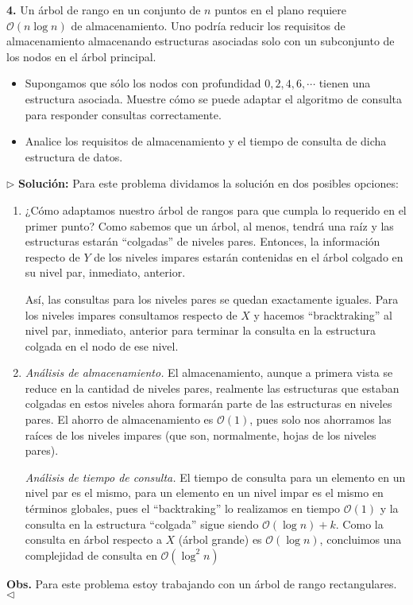 \textbf{4.} Un árbol de rango en un conjunto de $n$ puntos en el plano requiere
$\mathcal{O}(n \log n)$ de almacenamiento. Uno podría reducir los requisitos de
almacenamiento almacenando estructuras asociadas solo con un subconjunto de los
nodos en el árbol principal.

\begin{itemize}
\item Supongamos que sólo los nodos con profundidad $0, 2, 4, 6, \dotsm$ tienen
  una estructura asociada. Muestre cómo se puede adaptar el algoritmo de consulta
  para responder consultas correctamente.
\item Analice los requisitos de almacenamiento y el tiempo de consulta de dicha
  estructura de datos.
\end{itemize}

$\rhd$ \textbf{Solución:} Para este problema dividamos la solución en dos posibles
opciones:
\begin{enumerate}
\item ¿Cómo adaptamos nuestro árbol de rangos para que cumpla lo requerido en el primer
  punto? Como sabemos que un árbol, al menos, tendrá una raíz y las estructuras estarán
  ``colgadas'' de niveles pares. Entonces, la información respecto de $Y$ de los niveles
  impares estarán contenidas en el árbol colgado en su nivel par, inmediato, anterior.
  \newline
  
  Así, las consultas para los niveles pares se quedan exactamente iguales. Para los niveles
  impares consultamos respecto de $X$ y hacemos ``bracktraking'' al nivel par, inmediato,
  anterior para terminar la consulta en la estructura colgada en el nodo de ese nivel.
\item \textit{Análisis de almacenamiento.} El almacenamiento, aunque a primera vista se reduce
  en la cantidad de niveles pares, realmente las estructuras que estaban colgadas en estos niveles
  ahora formarán parte de las estructuras en niveles pares. El ahorro de almacenamiento es $\mathcal{O}(1)$,
  pues solo nos ahorramos las raíces de los niveles impares (que son, normalmente, hojas de los niveles
  pares).\newline
  
  \textit{Análisis de tiempo de consulta.} El tiempo de consulta para un elemento en un nivel par es el mismo,
  para un elemento en un nivel impar es el mismo en términos globales, pues el ``backtraking'' lo realizamos
  en tiempo $\mathcal{O}(1)$ y la consulta en la estructura ``colgada'' sigue siendo $\mathcal{O}(\log n) + k$.
  Como la consulta en árbol respecto a $X$ (árbol grande) es $\mathcal{O}(\log n)$, concluimos una
  complejidad de consulta en $\mathcal{O}(\log^2 n)$
\end{enumerate}
\textbf{Obs.} Para este problema estoy trabajando con un árbol de rango rectangulares.
\hfill $\lhd$

